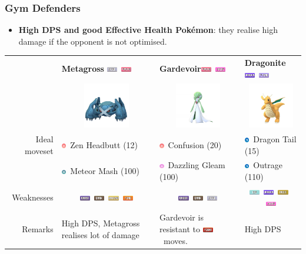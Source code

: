 \documentclass[12pt]{beamer}
\newcommand{\fightingfull}{\includegraphics[height=0.2cm]{../../images/type/full/Fighting.png}}
\newcommand{\darkfull}{\includegraphics[height=0.2cm]{../../images/type/full/Dark.png}}
\newcommand{\fairyfull}{\includegraphics[height=0.2cm]{../../images/type/full/Fairy.png}}
\newcommand{\firefull}{\includegraphics[height=0.2cm]{../../images/type/full/Fire.png}}
\newcommand{\flyingfull}{\includegraphics[height=0.2cm]{../../images/type/full/Flying.png}}
\newcommand{\ghostfull}{\includegraphics[height=0.2cm]{../../images/type/full/Ghost.png}}
\newcommand{\dragonfull}{\includegraphics[height=0.2cm]{../../images/type/full/Dragon.png}}
\newcommand{\groundfull}{\includegraphics[height=0.2cm]{../../images/type/full/Ground.png}}
\newcommand{\icefull}{\includegraphics[height=0.2cm]{../../images/type/full/Ice.png}}
\newcommand{\psychicfull}{\includegraphics[height=0.2cm]{../../images/type/full/Psychic.png}}
\newcommand{\rockfull}{\includegraphics[height=0.2cm]{../../images/type/full/Rock.png}}
\newcommand{\steelfull}{\includegraphics[height=0.2cm]{../../images/type/full/Steel.png}}
\newcommand{\dragonsimp}{\includegraphics[height=0.2cm]{../../images/type/simplified/dragon.png}}
\newcommand{\psysimp}{\includegraphics[height=0.2cm]{../../images/type/simplified/psy.png}}
\newcommand{\steelsimp}{\includegraphics[height=0.2cm]{../../images/type/simplified/steel.png}}
\newcommand{\fairysimp}{\includegraphics[height=0.2cm]{../../images/type/simplified/fairy.png}}
\begin{document}
\begin{frame}
\frametitle{Gym Defenders}

\begin{block}{}
\begin{footnotesize}

\begin{itemize}
  \item \textbf{High DPS and good Effective Health Pok\'emon}: they realise high damage if the opponent is not optimised. 
\end{itemize}

\begin{center}
\begin{tabular}{rp{3.2cm}p{3.2cm}p{3.2cm}}
& \textbf{Metagross} \hfill \steelfull~\psychicfull &  \textbf{Gardevoir}\hfill \psychicfull~\fairyfull & \textbf{Dragonite} \hfill \dragonfull~\flyingfull \\ 
&\multicolumn{1}{c}{\includegraphics[width=2cm]{../../images/pokemon/Metagross}} &
\multicolumn{1}{c}{\includegraphics[width=2cm]{../../images/pokemon/Gardevoir}} &
\multicolumn{1}{c}{\includegraphics[width=2cm]{../../images/pokemon/Dragonite}}   \\ \hline
Ideal moveset &  \psysimp~Zen Headbutt (12) & \psysimp~Confusion (20) &  \dragonsimp~Dragon Tail (15)\\ 
&\steelsimp~Meteor Mash (100) & \fairysimp~Dazzling Gleam (100) & \dragonsimp~Outrage (110)  \\ \hline
Weaknesses & \multicolumn{1}{c}{\ghostfull~\darkfull~\groundfull~\firefull} & \multicolumn{1}{c}{\ghostfull~\darkfull~\steelfull} & \multicolumn{1}{c}{\icefull~\dragonfull~\rockfull~\fairyfull}  \\ \hline
Remarks & High DPS, Metagross realises lot of damage & Gardevoir is resistant to \fightingfull~moves. & High DPS \\ 
\end{tabular}
\end{center}


\end{footnotesize}
\end{block}
\end{frame}
\end{document}
